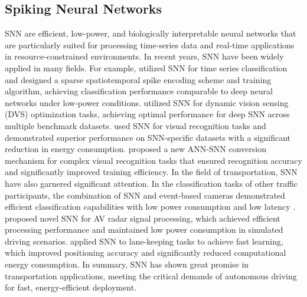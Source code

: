 \subsection{Spiking Neural Networks}
SNN are efficient, low-power, and biologically interpretable neural networks that are particularly suited for processing time-series data and real-time applications in resource-constrained environments.
In recent years, SNN have been widely applied in many fields. For example, \cite{fang2020multivariate} utilized SNN for time series classification and designed a sparse spatiotemporal spike encoding scheme and training algorithm, achieving classification performance comparable to deep neural networks under low-power conditions. \cite{kim2021optimizing} utilized SNN for dynamic vision sensing (DVS) optimization tasks, achieving optimal performance for deep SNN across multiple benchmark datasets. \cite{deng2020rethinking} used SNN for visual recognition tasks and demonstrated superior performance on SNN-specific datasets with a significant reduction in energy consumption. \cite{sengupta2019going} proposed a new ANN-SNN conversion mechanism for complex visual recognition tasks that ensured recognition accuracy and significantly improved training efficiency.
In the field of transportation, SNN have also garnered significant attention.
In the classification tasks of other traffic participants, the combination of SNN and event-based cameras demonstrated efficient classification capabilities with low power consumption and low latency \cite{viale2021carsnn}.
\cite{lopez2021spiking} proposed novel SNN for AV radar signal processing, which achieved efficient processing performance and maintained low power consumption in simulated driving scenarios.
\cite{bing2020indirect} applied SNN to lane-keeping tasks to achieve fast learning, which improved positioning accuracy and significantly reduced computational energy consumption.
In summary, SNN has shown great promise in transportation applications, meeting the critical demands of autonomous driving for fast, energy-efficient deployment.